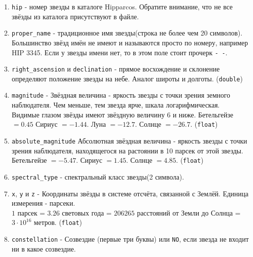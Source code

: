 \documentclass{article}
\begin{document}
\begin{enumerate}
\item \texttt{hip} - номер звезды в каталоге Hipparcos. Обратите внимание, что не все звёзды из каталога присутствуют в файле.
\item \texttt{proper\_name} - традиционное имя звезды(строка не более чем 20 символов). Большинство звёзд имён не имеют и называются просто по номеру, например HIP 3345. Если у звезды имени нет, то в этом поле стоит прочерк \texttt{-\,-}.
\item \texttt{right\_ascension} и \texttt{declination} - прямое восхождение и склонение определяют положение звезды на небе. Аналог широты и долготы. (\texttt{double})
\item \texttt{magnitude} - Звёздная величина - яркость звезды с точки зрения земного наблюдателя. Чем меньше, тем звезда ярче, шкала логарифмическая. Видимые глазом звёзды имеют звёздную величину 6 и ниже. Бетельгейзе $= 0.45$ Сириус $= -1.44$. Луна $= -12.7$. Солнце $= -26.7$.  (\texttt{float})
\item \texttt{absolute\_magnitude} Абсолютная звёздная величина - яркость звезды с точки зрения наблюдателя, находящегося на растоянии в 10 парсек от этой звезды. Бетельгейзе $= -5.47$. Сириус $= 1.45$. Солнце $= 4.85$. (\texttt{float})
\item \texttt{spectral\_type} - спектральный класс звезды(2 символа). 
\item \texttt{x}, \texttt{y} и \texttt{z} - Координаты звёзды в системе отсчёта, связанной с Землёй. Единица измерения - парсеки. \\
$1$ парсек = $3.26$ световых года = $206265$ расстояний от Земли до Солнца = $3 \cdot 10^{16}$ метров. (\texttt{float})
\item \texttt{constellation} - Созвездие (первые три буквы) или \texttt{NO}, если звезда не входит ни в какое созвездие.
\end{enumerate}
\end{document}
